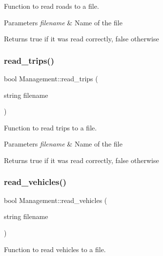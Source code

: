 Function to read roads to a file. 


\begin{DoxyParams}{Parameters}
{\em filename} & Name of the file \\
\hline
\end{DoxyParams}
\begin{DoxyReturn}{Returns}
true if it was read correctly, false otherwise 
\end{DoxyReturn}
\mbox{\label{class_management_a84634ca51dce29ab60e964128302cc4c}} 
\subsubsection{\texorpdfstring{read\+\_\+trips()}{read\_trips()}}
{\footnotesize\ttfamily bool Management\+::read\+\_\+trips (\begin{DoxyParamCaption}\item[{string}]{filename }\end{DoxyParamCaption})}



Function to read trips to a file. 


\begin{DoxyParams}{Parameters}
{\em filename} & Name of the file \\
\hline
\end{DoxyParams}
\begin{DoxyReturn}{Returns}
true if it was read correctly, false otherwise 
\end{DoxyReturn}
\mbox{\label{class_management_af37e787a2e40e21afc0a6f7ca2742cd3}} 
\subsubsection{\texorpdfstring{read\+\_\+vehicles()}{read\_vehicles()}}
{\footnotesize\ttfamily bool Management\+::read\+\_\+vehicles (\begin{DoxyParamCaption}\item[{string}]{filename }\end{DoxyParamCaption})}



Function to read vehicles to a file. 


